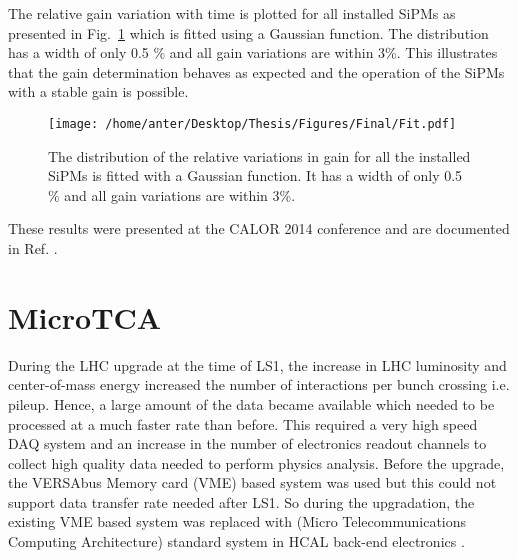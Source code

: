 The relative gain variation with time is plotted for all installed SiPMs as presented in Fig.~\ref{fig:gain2} which is fitted using a Gaussian function. The distribution has a width of only 0.5 \% and all gain variations are within 3\%. This illustrates that the gain determination behaves as expected and the operation of the SiPMs with a stable gain is possible. 
\begin{figure}[!h]
\begin{center}
\texttt{[image: /home/anter/Desktop/Thesis/Figures/Final/Fit.pdf]}
\vspace*{4mm}
\caption{The distribution of the relative variations in gain for all the installed SiPMs is fitted with a Gaussian function. It has a width of only 0.5 \% and all gain variations are within 3\%.}
\label{fig:gain2}
\end{center}
\end{figure}
These results were presented at the CALOR 2014 conference \cite{Kunsken:2015zla} and are documented in Ref. \cite{DN}.

\section{MicroTCA}
During the LHC upgrade at the time of LS1, the increase in LHC luminosity and center-of-mass energy increased the number of interactions per bunch crossing i.e. pileup. Hence, a large amount of the data became available which needed to be processed at a much faster rate than before. This required a very high speed DAQ system and an increase in the number of electronics readout channels to collect high quality data needed to perform physics analysis. Before the upgrade, the VERSAbus Memory card (VME) based system was used but this could not support data transfer rate needed after LS1. So during the upgradation, the existing VME based system was replaced with \mtca (Micro Telecommunications Computing Architecture) standard system in HCAL back-end electronics \cite{CMS:2012tda}. 

